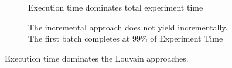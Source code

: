 \begin{figure}[htbp]
    \centering
    \begin{subfigure}[b]{0.45\textwidth}  %
        \centering
        \caption{Execution time dominates total experiment time}
        \label{fig:et-proportion}
    \end{subfigure}
    \hfill
    \begin{subfigure}[b]{0.45\textwidth}  %
        \centering
        \caption{The incremental approach does not yield incrementally. The first batch completes at 99\% of Experiment Time}
        \label{fig:bl-propotrion}
    \end{subfigure}
    \caption{Execution time dominates the Louvain approaches.}
    \label{fig:cd-results-efficency-proportions}
\end{figure}
